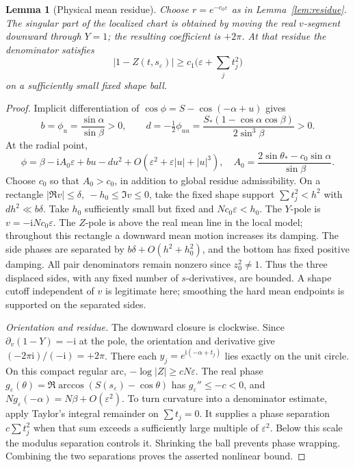 \documentclass[11pt]{article}
\numberwithin{equation}{section}
\newtheorem{lemma}[theorem]{Lemma}
\theoremstyle{definition}
\newcommand{\ii}{\mathrm i}
\newcommand{\eps}{\varepsilon}
\newcommand{\se}{s_\varepsilon}
\begin{document}
\begin{lemma}[Physical mean residue]\label{lem:mean}
Choose \(r=e^{-c_0\eps}\) as in Lemma~\ref{lem:residue}. The singular
part of the localized chart is obtained by moving the real \(v\)-segment
downward through \(Y=1\); the resulting coefficient is \(+2\pi\).
At that residue the denominator satisfies
\[
 |1-Z(t,\se)|\ge c_1\bigl(\eps+\textstyle\sum_jt_j^2\bigr)
\]
on a sufficiently small fixed shape ball.
\end{lemma}
\begin{proof}
Implicit differentiation of \(\cos\phi=S-\cos(-\alpha+u)\) gives
\[
 b=\phi_u=\frac{\sin\alpha}{\sin\beta}>0,\qquad
 d=-\tfrac12\phi_{uu}
   =\frac{S_*(1-\cos\alpha\cos\beta)}{2\sin^3\beta}>0.
\]
At the radial point,
\[
 \phi=\beta-\ii A_0\eps+bu-du^2
       +O(\eps^2+\eps|u|+|u|^3),\quad
 A_0=\frac{2\sin\theta_*-c_0\sin\alpha}{\sin\beta}.
\]
Choose \(c_0\) so that \(A_0>c_0\), in addition to global residue
admissibility. On a rectangle \(|\Re v|\le\delta,\ -h_0\le\Im v\le0\),
take the fixed shape support \(\sum t_j^2<h^2\) with \(dh^2\ll b\delta\).
Take \(h_0\) sufficiently small but fixed and \(Nc_0\eps<h_0\).
The \(Y\)-pole is \(v=-\ii Nc_0\eps\). The \(Z\)-pole is above the
real mean line in the local model; throughout this rectangle a downward
mean motion increases its damping. The side phases are separated by
\(b\delta+O(h^2+h_0^2)\), and the bottom has fixed positive damping.
All pair denominators remain nonzero since \(z_0^2\ne1\).
Thus the three displaced sides, with any fixed number of \(s\)-derivatives,
are bounded. A shape cutoff independent of \(v\) is legitimate here;
smoothing the hard mean endpoints is supported on the separated sides.

\smallskip\noindent\textit{Orientation and residue.}
The downward closure is clockwise. Since
\(\partial_v(1-Y)=-\ii\) at the pole, the orientation and derivative
give \((-2\pi\ii)/(-\ii)=+2\pi\).
There each \(y_j=e^{\ii(-\alpha+t_j)}\) lies exactly on the unit circle.
On this compact regular arc, \(-\log|Z|\ge cN\eps\).
The real phase \(g_\eps(\theta)=\Re\arccos(S(\se)-\cos\theta)\) has
\(g_\eps''\le-c<0\), and
\(N g_\eps(-\alpha)=N\beta+O(\eps^2)\).
To turn curvature into a denominator estimate, apply Taylor's integral
remainder on \(\sum t_j=0\). It supplies a phase separation \(c\sum t_j^2\) when that sum exceeds a sufficiently large
multiple of \(\eps^2\). Below this scale the modulus separation
controls it. Shrinking the ball prevents phase wrapping. Combining
the two separations proves the asserted nonlinear bound.
\end{proof}
\end{document}

